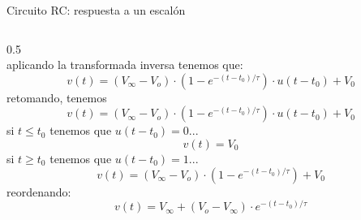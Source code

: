 \documentclass[aspectratio=169]{beamer}
\begin{document}
\begin{frame}{Circuito RC: respuesta a un escalón}
\begin{columns}
\begin{column}{0.5\textwidth}
{{\begin{equation*}
                \end{equation*}
            }
                {aplicando la transformada inversa tenemos que:
                \begin{equation*}
                    v(t) = (V_\infty - V_o) \cdot (1 - e^{-(t-t_0)/\tau}) \cdot u(t-t_0) + V_0
                \end{equation*}
            }
        }
            {
            {retomando, tenemos
                \begin{equation*}
                    v(t) = (V_\infty - V_o) \cdot (1 - e^{-(t-t_0)/\tau}) \cdot u(t-t_0) + V_0
                \end{equation*}
            }
                {si $t\leq t_0$ tenemos que $u(t-t_0) = 0$...
                \begin{equation*}
                     v(t) = V_0
                \end{equation*}
            }
                {si $t\geq t_0$ tenemos que $u(t-t_0) = 1$...
                \begin{equation*}
                     v(t) = (V_\infty - V_o) \cdot (1 - e^{-(t-t_0)/\tau}) + V_0
                \end{equation*}
            }
                {reordenando: 
                \begin{equation*}
                     v(t) = V_\infty + (V_o - V_\infty) \cdot e^{-(t-t_0)/\tau}
                \end{equation*}
            }
        }
    \end{column}
\end{columns}
\end{frame}


% 

% 

\end{document}
